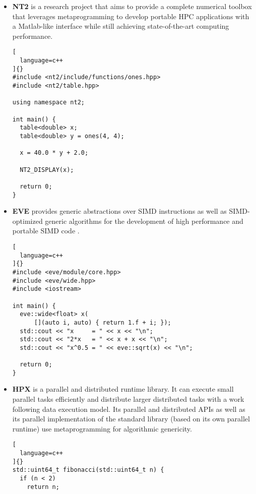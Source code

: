 \documentclass[../main]{subfiles}
\begin{document}
\begin{itemize}
\begin{lstlisting}[
  language=c++
]{}
  DynamicVector<int> c = a + b;

  std::cout << "c =\n" << c << "\n";
}
\end{lstlisting}

\item
\textbf{NT2} \cite{nt2} is a research project that aims to provide a complete
numerical toolbox that leverages metaprogramming to develop portable HPC
applications with a Matlab-like interface while still achieving state-of-the-art
computing performance.

\begin{lstlisting}[
  language=c++
]{}
#include <nt2/include/functions/ones.hpp>
#include <nt2/table.hpp>

using namespace nt2;

int main() {
  table<double> x;
  table<double> y = ones(4, 4);

  x = 40.0 * y + 2.0;

  NT2_DISPLAY(x);

  return 0;
}
\end{lstlisting}

\item
\textbf{EVE} \cite{eve} provides generic abstractions over SIMD instructions
as well as SIMD-optimized generic algorithms for the development of
high performance and portable SIMD code \cite{hpcs2018-matvec}.

\begin{lstlisting}[
  language=c++
]{}
#include <eve/module/core.hpp>
#include <eve/wide.hpp>
#include <iostream>

int main() {
  eve::wide<float> x(
      [](auto i, auto) { return 1.f + i; });
  std::cout << "x     = " << x << "\n";
  std::cout << "2*x   = " << x + x << "\n";
  std::cout << "x^0.5 = " << eve::sqrt(x) << "\n";

  return 0;
}
\end{lstlisting}

\item
\textbf{HPX} \cite{hpx} is a \cpp parallel and distributed runtime library.
It can execute small parallel tasks efficiently and distribute
larger distributed tasks with a work following data execution model.
Its parallel and distributed APIs as well as its parallel implementation of
the standard library (based on its own parallel runtime) use metaprogramming
for algorithmic genericity.

\begin{lstlisting}[
  language=c++
]{}
std::uint64_t fibonacci(std::uint64_t n) {
  if (n < 2)
    return n;


\end{lstlisting}
\end{itemize}
\end{document}
